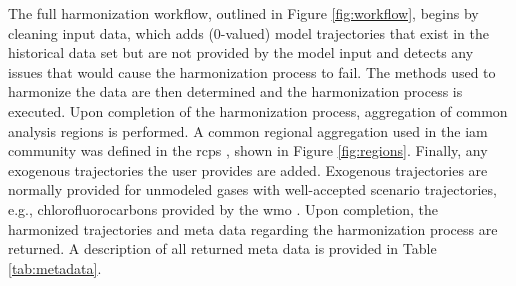 \documentclass[review]{elsarticle}
\newcommand{\code}[1]{\lstinline[basicstyle=\ttfamily\color{black}]|#1|}
\begin{document}

The full harmonization workflow, outlined in Figure \ref{fig:workflow}, begins
by cleaning input data, which adds (0-valued) model trajectories that exist in
the historical data set but are not provided by the model input and detects any
issues that would cause the harmonization process to fail. The methods used to
harmonize the data are then determined and the harmonization process is
executed. Upon completion of the harmonization process, aggregation of common
analysis regions is performed. A common regional aggregation used in the
\gls{iam} community was defined in the \glspl{rcp}
\cite{vuuren_representative_2011}, shown in Figure \ref{fig:regions}. Finally,
any exogenous trajectories the user provides are added. Exogenous trajectories
are normally provided for unmodeled gases with well-accepted scenario
trajectories, e.g., chlorofluorocarbons provided by the \gls{wmo}
\cite{wmo2014}. Upon completion, the harmonized trajectories and meta data
regarding the harmonization process are returned. A description of all returned
meta data is provided in Table \ref{tab:metadata}.
\end{document}
